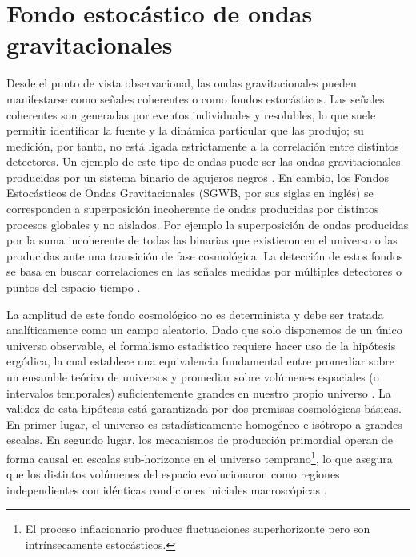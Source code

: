 \section{Fondo estocástico de ondas gravitacionales}

Desde el punto de vista observacional, las ondas gravitacionales pueden manifestarse como señales coherentes o como fondos estocásticos. Las señales coherentes son generadas por eventos individuales y resolubles, lo que suele permitir identificar la fuente y la dinámica particular que las produjo; su medición, por tanto, no está ligada estrictamente a la correlación entre distintos detectores. Un ejemplo de este tipo de ondas puede ser las ondas gravitacionales producidas por un sistema binario de agujeros negros \cite{LIGO}. En cambio, los Fondos Estocásticos de Ondas Gravitacionales (SGWB, por sus siglas en inglés) se corresponden a superposición incoherente de ondas producidas por distintos procesos globales y no aislados. Por ejemplo la superposición de ondas producidas por la suma incoherente de todas las binarias que existieron en el universo o las producidas ante una transición de fase cosmológica. La detección de estos fondos se basa en buscar correlaciones en las señales medidas por múltiples detectores o puntos del espacio-tiempo \cite{Caprini_2020, Renzini2022}.

La amplitud de este fondo cosmológico no es determinista y debe ser tratada analíticamente como un campo aleatorio. Dado que solo disponemos de un único universo observable, el formalismo estadístico requiere hacer uso de la hipótesis ergódica, la cual establece una equivalencia fundamental entre promediar sobre un ensamble teórico de universos y promediar sobre volúmenes espaciales (o intervalos temporales) suficientemente grandes en nuestro propio universo \cite{Renzini2022}. La validez de esta hipótesis está garantizada por dos premisas cosmológicas básicas. En primer lugar, el universo es estadísticamente homogéneo e isótropo a grandes escalas. En segundo lugar, los mecanismos de producción primordial operan de forma causal en escalas sub-horizonte en el universo temprano\footnote{El proceso inflacionario produce fluctuaciones superhorizonte pero son intrínsecamente estocásticos.}, lo que asegura que los distintos volúmenes del espacio evolucionaron como regiones independientes con idénticas condiciones iniciales macroscópicas \cite{Renzini2022, Christensen_2018}.


